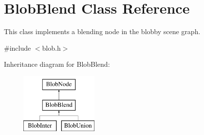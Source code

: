 \hypertarget{class_blob_blend}{
\section{BlobBlend Class Reference}
\label{class_blob_blend}
}


This class implements a blending node in the blobby scene graph.  




{\ttfamily \#include $<$blob.h$>$}

Inheritance diagram for BlobBlend:\begin{figure}[H]
\begin{center}
\leavevmode
\includegraphics[height=3.000000cm]{class_blob_blend}
\end{center}
\end{figure}
